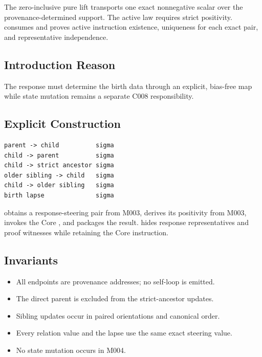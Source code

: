 The zero-inclusive pure lift transports one exact nonnegative scalar
over the provenance-determined support. The active law requires strict
positivity. \texttt{\protect{}} consumes
\texttt{\protect{}} and proves active instruction
existence, uniqueness for each exact pair, and representative
independence.

\subsection{Introduction Reason}\label{introduction-reason-25}

The response must determine the birth data through an explicit,
bias-free map while state mutation remains a separate C008
responsibility.

\subsection{Explicit Construction}\label{explicit-construction-9}

\begin{verbatim}
parent -> child          sigma
child -> parent          sigma
child -> strict ancestor sigma
older sibling -> child   sigma
child -> older sibling   sigma
birth lapse              sigma
\end{verbatim}

\texttt{\protect{}} obtains a response-steering pair from
M003, derives its positivity from M003, invokes the Core
\texttt{\protect{}}, and packages the result.
\texttt{\protect{}} hides response
representatives and proof witnesses while retaining the Core
instruction.

\subsection{Invariants}\label{invariants-9}

\begin{itemize}
\tightlist
\item
  All endpoints are provenance addresses; no self-loop is emitted.
\item
  The direct parent is excluded from the strict-ancestor updates.
\item
  Sibling updates occur in paired orientations and canonical order.
\item
  Every relation value and the lapse use the same exact steering value.
\item
  No state mutation occurs in M004.
\end{itemize}


